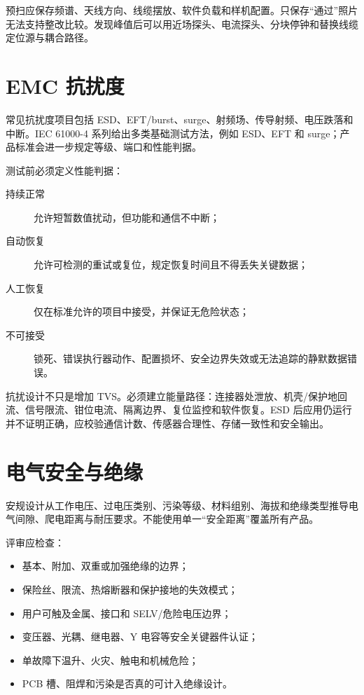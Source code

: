 预扫应保存频谱、天线方向、线缆摆放、软件负载和样机配置。只保存“通过”照片无法支持整改比较。发现峰值后可以用近场探头、电流探头、分块停钟和替换线缆定位源与耦合路径。

\section{EMC 抗扰度}

常见抗扰度项目包括 ESD、EFT/burst、surge、射频场、传导射频、电压跌落和中断。IEC 61000-4 系列给出多类基础测试方法，例如 ESD、EFT 和 surge\cite{iec61000-4-2,iec61000-4-4,iec61000-4-5}；产品标准会进一步规定等级、端口和性能判据。

测试前必须定义性能判据：
\begin{description}
  \item[持续正常] 允许短暂数值扰动，但功能和通信不中断；
  \item[自动恢复] 允许可检测的重试或复位，规定恢复时间且不得丢失关键数据；
  \item[人工恢复] 仅在标准允许的项目中接受，并保证无危险状态；
  \item[不可接受] 锁死、错误执行器动作、配置损坏、安全边界失效或无法追踪的静默数据错误。
\end{description}

抗扰设计不只是增加 TVS。必须建立能量路径：连接器处泄放、机壳/保护地回流、信号限流、钳位电流、隔离边界、复位监控和软件恢复。ESD 后应用仍运行并不证明正确，应校验通信计数、传感器合理性、存储一致性和安全输出。

\section{电气安全与绝缘}

安规设计从工作电压、过电压类别、污染等级、材料组别、海拔和绝缘类型推导电气间隙、爬电距离与耐压要求。不能使用单一“安全距离”覆盖所有产品。

评审应检查：
\begin{itemize}
  \item 基本、附加、双重或加强绝缘的边界；
  \item 保险丝、限流、热熔断器和保护接地的失效模式；
  \item 用户可触及金属、接口和 SELV/危险电压边界；
  \item 变压器、光耦、继电器、Y 电容等安全关键器件认证；
  \item 单故障下温升、火灾、触电和机械危险；
  \item PCB 槽、阻焊和污染是否真的可计入绝缘设计。
\end{itemize}

